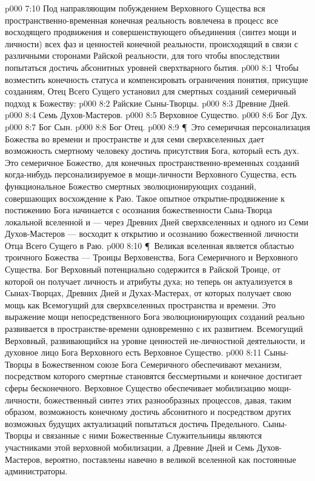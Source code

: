 \vs p000 7:10 Под направляющим побуждением Верховного Существа вся пространственно\hyp{}временная конечная реальность вовлечена в процесс все восходящего продвижения и совершенствующего объединения (синтез мощи и личности) всех фаз и ценностей конечной реальности, происходящий в связи с различными сторонами Райской реальности, для того чтобы впоследствии попытаться достичь абсонитных уровней сверхтварного бытия.
\vs p000 8:1 Чтобы возместить конечность статуса и компенсировать ограничения понятия, присущие созданиям, Отец Всего Сущего установил для смертных созданий семеричный подход к Божеству:
\vs p000 8:2 \bibnobreakspace Райские Сыны\hyp{}Творцы.
\vs p000 8:3 \bibnobreakspace Древние Дней.
\vs p000 8:4 \bibnobreakspace Семь Духов\hyp{}Мастеров.
\vs p000 8:5 \bibnobreakspace Верховное Существо.
\vs p000 8:6 \bibnobreakspace Бог Дух.
\vs p000 8:7 \bibnobreakspace Бог Сын.
\vs p000 8:8 \bibnobreakspace Бог Отец.
\vs p000 8:9 \P\ Это семеричная персонализация Божества во времени и пространстве и для семи сверхвселенных дает возможность смертному человеку достичь присутствия Бога, который есть дух. Это семеричное Божество, для конечных пространственно\hyp{}временных созданий когда\hyp{}нибудь персонализируемое в мощи\hyp{}личности Верховного Существа, есть функциональное Божество смертных эволюционирующих созданий, совершающих восхождение к Раю. Такое опытное открытие\hyp{}продвижение к постижению Бога начинается с осознания божественности Сына\hyp{}Творца локальной вселенной и --- через Древних Дней сверхвселенных и одного из Семи Духов\hyp{}Мастеров --- восходит к открытию и осознанию божественной личности Отца Всего Сущего в Раю.
\vs p000 8:10 \P\ Великая вселенная является областью троичного Божества --- Троицы Верховенства, Бога Семеричного и Верховного Существа. Бог Верховный потенциально содержится в Райской Троице, от которой он получает личность и атрибуты духа; но теперь он актуализуется в Сынах\hyp{}Творцах, Древних Дней и Духах\hyp{}Мастерах, от которых получает свою мощь как Всемогущий для сверхвселенных пространства и времени. Это выражение мощи непосредственного Бога эволюционирующих созданий реально развивается в пространстве\hyp{}времени одновременно с их развитием. Всемогущий Верховный, развивающийся на уровне ценностей не\hyp{}личностной деятельности, и духовное лицо Бога Верховного есть  Верховное Существо.
\vs p000 8:11 Сыны\hyp{}Творцы в Божественном союзе Бога Семеричного обеспечивают механизм, посредством которого смертные становятся бессмертными и конечное достигает сферы бесконечного. Верховное Существо обеспечивает мобилизацию мощи\hyp{}личности, божественный синтез  этих разнообразных процессов, давая, таким образом, возможность конечному достичь абсонитного и посредством других возможных будущих актуализаций попытаться достичь Предельного. Сыны\hyp{}Творцы и связанные с ними Божественные Служительницы являются участниками этой верховной мобилизации, а Древние Дней и Семь Духов\hyp{}Мастеров, вероятно, поставлены навечно в великой вселенной как постоянные администраторы.
